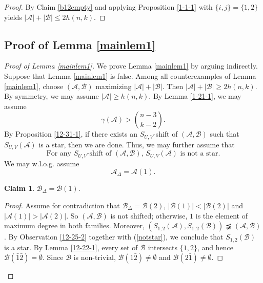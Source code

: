 \documentclass[a4paper,11pt]{article}
\newtheorem{claim}[theorem]{Claim}
\newcommand{\m}{\mathcal}
\begin{document}
\begin{proof}
By Claim \ref{b12empty} and applying Proposition \ref{1-1-1} with $\{i,j\}=\{1,2\}$ yields $|\m A|+|\m B|\le 2h(n,k)$. 
\end{proof}


\subsection{Proof of Lemma \ref{mainlem1}}

\begin{proof}[Proof of Lemma \ref{mainlem1}]
We prove Lemma \ref{mainlem1} by arguing indirectly. Suppose that
Lemma \ref{mainlem1} is false. Among all counterexamples of
Lemma \ref{mainlem1}, choose $(\m A,\m B)$ maximizing
$|\m A|+|\m B|$.
Then 
$|\mathcal{A}|+|\mathcal{B}|\ge 2h(n,k).$
By symmetry, we may assume
$|\mathcal{A}|\ge h(n,k).$
By Lemma \ref{1-21-1}, we may assume
\begin{equation*}\label{12-19-2}
  \gamma(\mathcal{A})> {n-3\choose k-2}.
\end{equation*}
By Proposition \ref{12-31-1}, if there exists an $S_{U,V}$-shift of $(\m A, \m B)$ such that $S_{U,V}(\m A)$ is a star, then we are done. Thus, we may further assume that
\begin{equation}\label{notstar}
\text{For any $S_{U,V}$-shift of $(\m A, \m B)$, $S_{U,V}(\m A)$ is not a star.}    
\end{equation}
We may w.l.o.g. assume 
$$\m A_{\Delta}=\m A(1).$$

\begin{claim}\label{samemaxd}
    $\m B_{\Delta}=\m B(1).$
\end{claim}

\begin{proof}
Assume for contradiction that $\m B_{\Delta}=\m B(2)$, $|\m B(1)|<|\m B(2)|$ and $|\m A(1)|>|\m A(2)|$.
So $(\mathcal{A}, \mathcal{B})$ is not shifted; otherwise,  $1$ is the element of maximum degree in both families. Moreover, 
$(S_{1,2}(\mathcal{A}), S_{1,2}(\mathcal{B}))\precneqq(\mathcal{A},\mathcal{B})$. 
By Observation \ref{12-25-2} together with (\ref{notstar}), we conclude that $S_{1,2}(\mathcal{B})$ is a star. 
By Lemma \ref{12-22-1}, every set of $\mathcal{B}$ intersects  $\{1,2\}$, and hence $\m B(\bar 1\bar 2)=\emptyset$. 
Since $\mathcal{B}$ is non-trivial, $\mathcal{B}(1\bar{2})\ne \emptyset$ and $\mathcal{B}(2\bar{1})\ne \emptyset$.
 


\end{proof}
\end{proof}
\end{document}
